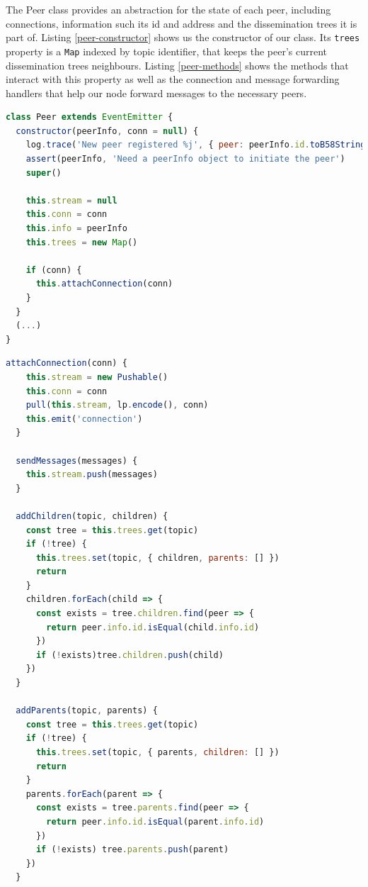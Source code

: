 The Peer class provides an abstraction for the state of each peer, including
connections, information such its id and address and the dissemination trees it
is part of. Listing \ref{peer-constructor} shows us the constructor of our
class. Its \verb|trees| property is a \verb|Map| indexed by topic identifier,
that keeps the peer's current dissemination trees neighbours.  Listing
\ref{peer-methods} shows the methods that interact with this property as well
as the connection and message forwarding handlers that help our node forward
messages to the necessary peers.

\begin{lstlisting}[language=JavaScript, float=p, caption={Peer class constructor},label={peer-constructor}]
class Peer extends EventEmitter {
  constructor(peerInfo, conn = null) {
    log.trace('New peer registered %j', { peer: peerInfo.id.toB58String() })
    assert(peerInfo, 'Need a peerInfo object to initiate the peer')
    super()

    this.stream = null
    this.conn = conn
    this.info = peerInfo
    this.trees = new Map()

    if (conn) {
      this.attachConnection(conn)
    }
  }
  (...)
}
\end{lstlisting}

\begin{lstlisting}[language=JavaScript, float=p, caption={Peer class relevant methods},label={peer-methods}]
  attachConnection(conn) {
    this.stream = new Pushable()
    this.conn = conn
    pull(this.stream, lp.encode(), conn)
    this.emit('connection')
  }

  sendMessages(messages) {
    this.stream.push(messages)
  }

  addChildren(topic, children) {
    const tree = this.trees.get(topic)
    if (!tree) {
      this.trees.set(topic, { children, parents: [] })
      return
    }
    children.forEach(child => {
      const exists = tree.children.find(peer => {
        return peer.info.id.isEqual(child.info.id)
      })
      if (!exists)tree.children.push(child)
    })
  }

  addParents(topic, parents) {
    const tree = this.trees.get(topic)
    if (!tree) {
      this.trees.set(topic, { parents, children: [] })
      return
    }
    parents.forEach(parent => {
      const exists = tree.parents.find(peer => {
        return peer.info.id.isEqual(parent.info.id)
      })
      if (!exists) tree.parents.push(parent)
    })
  }
\end{lstlisting}

